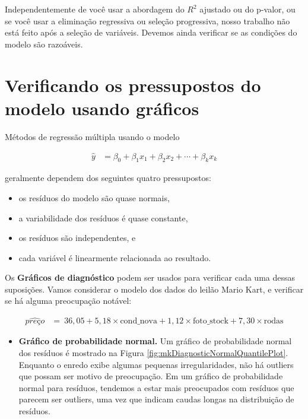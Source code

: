 \documentclass[
]{book}
\providecommand{\tightlist}{%
  \setlength{\itemsep}{0pt}\setlength{\parskip}{0pt}}
\theoremstyle{definition}
\theoremstyle{definition}
\theoremstyle{definition}
\theoremstyle{definition}
\theoremstyle{remark}
\begin{document}
Independentemente de você usar a abordagem do \(R^2\) ajustado ou do p-valor, ou se você usar a eliminação regressiva ou seleção progressiva, nosso trabalho não está feito após a seleção de variáveis. Devemos ainda verificar se as condições do modelo são razoáveis.

\hypertarget{multipleRegressionModelAssumptions}{%
\section{Verificando os pressupostos do modelo usando gráficos}\label{multipleRegressionModelAssumptions}}

Métodos de regressão múltipla usando o modelo

\begin{align*}
\hat{y} &= \beta_0 + \beta_1x_1 + \beta_2x_2 + \cdots + \beta_kx_k
\end{align*}

geralmente dependem dos seguintes quatro pressupostos:

\begin{itemize}
\item
  os resíduos do modelo são quase normais,
\item
  a variabilidade dos resíduos é quase constante,
\item
  os resíduos são independentes, e
\item
  cada variável é linearmente relacionada ao resultado.
\end{itemize}

Os \textbf{Gráficos de diagnóstico} podem ser usados para verificar cada uma dessas suposições. Vamos considerar o modelo dos dados do leilão Mario Kart, e verificar se há alguma preocupação notável:

\begin{align*}
\widehat{preço} &= \ 36,05 + 5,18 \times \text{cond\_nova} + 1,12 \times \text{foto\_stock} + 7,30 \times \text{rodas}
\end{align*}

\begin{itemize}
\tightlist
\item
  \textbf{Gráfico de probabilidade normal.} Um gráfico de probabilidade normal dos resíduos é mostrado na Figura \ref{fig:mkDiagnosticNormalQuantilePlot}. Enquanto o enredo exibe algumas pequenas irregularidades, não há outliers que possam ser motivo de preocupação. Em um gráfico de probabilidade normal para resíduos, tendemos a estar mais preocupados com resíduos que parecem ser outliers, uma vez que indicam caudas longas na distribuição de resíduos.
\end{itemize}
\end{document}

